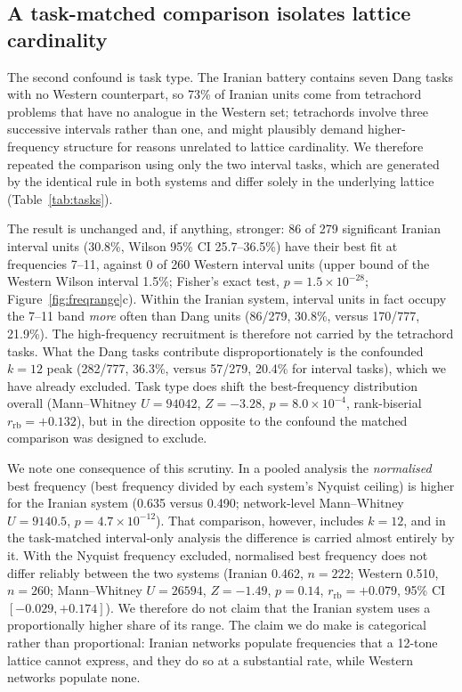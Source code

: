 \documentclass[pdflatex,sn-nature]{sn-jnl}
\newcommand{\num}[1]{#1}
\begin{document}
\subsection{A task-matched comparison isolates lattice cardinality}
The second confound is task type. The Iranian battery contains seven Dang tasks with no
Western counterpart, so \num{73}\% of Iranian units come from tetrachord problems that have
no analogue in the Western set; tetrachords involve three successive intervals rather than
one, and might plausibly demand higher-frequency structure for reasons unrelated to lattice
cardinality. We therefore repeated the comparison using only the two interval tasks, which
are generated by the identical rule in both systems and differ solely in the underlying
lattice (Table~\ref{tab:tasks}).

The result is unchanged and, if anything, stronger: \num{86} of \num{279} significant
Iranian interval units (\num{30.8}\%, Wilson 95\% CI \num{25.7}--\num{36.5}\%) have their
best fit at frequencies 7--11, against \num{0} of \num{260} Western interval units
(upper bound of the Western Wilson interval \num{1.5}\%; Fisher's exact test,
$p = \num{1.5\times10^{-28}}$; Figure~\ref{fig:freqrange}c). Within
the Iranian system, interval units in fact occupy the 7--11 band \emph{more} often than Dang
units (\num{86}/\num{279}, \num{30.8}\%, versus \num{170}/\num{777}, \num{21.9}\%). The
high-frequency recruitment is therefore not carried by the tetrachord tasks. What the Dang
tasks contribute disproportionately is the confounded $k=12$ peak (\num{282}/\num{777},
\num{36.3}\%, versus \num{57}/\num{279}, \num{20.4}\% for interval tasks), which we have
already excluded. Task type does shift the best-frequency distribution overall
(Mann--Whitney $U = \num{94042}$, $Z = \num{-3.28}$, $p = \num{8.0\times10^{-4}}$,
rank-biserial $r_{\mathrm{rb}} = \num{+0.132}$), but in the direction opposite to the
confound the matched comparison was designed to exclude.

We note one consequence of this scrutiny. In a pooled analysis the \emph{normalised} best
frequency (best frequency divided by each system's Nyquist ceiling) is higher for the
Iranian system (\num{0.635} versus \num{0.490}; network-level Mann--Whitney
$U = \num{9140.5}$, $p = \num{4.7\times10^{-12}}$). That comparison, however, includes
$k=12$, and in the task-matched interval-only analysis the difference is carried almost
entirely by it. With the Nyquist frequency excluded, normalised best frequency does not
differ reliably between the two systems (Iranian \num{0.462}, $n=\num{222}$; Western
\num{0.510}, $n=\num{260}$; Mann--Whitney $U = \num{26594}$, $Z = \num{-1.49}$,
$p = \num{0.14}$, $r_{\mathrm{rb}} = \num{+0.079}$, 95\% CI
$[\num{-0.029}, \num{+0.174}]$).
We therefore do not claim that the Iranian system uses a proportionally higher share of its
range. The claim we do make is categorical rather than proportional: Iranian networks
populate frequencies that a 12-tone lattice cannot express, and they do so at a substantial
rate, while Western networks populate none.
\end{document}
